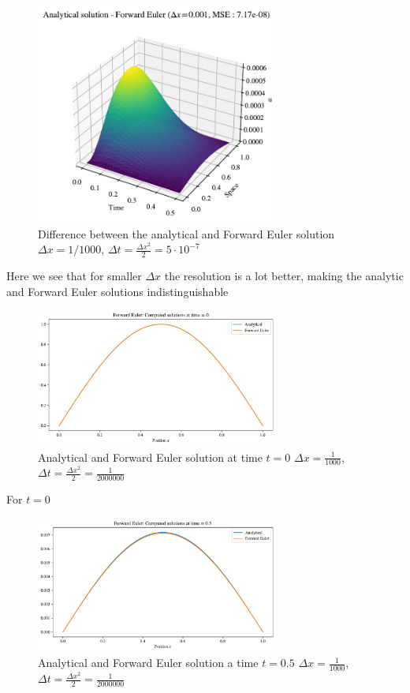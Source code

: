 \documentclass{article}
\theoremstyle{definition}
\begin{document}
\begin{figure}[H]%
    \centering
    \includegraphics[width=8cm]{Project3/figures/1dHeat/dx=0.001.pdf}
    \caption{Difference between the analytical and Forward Euler solution $\Delta x = 1 / 1000$, $\Delta t = \frac{\Delta x^2}{2} = 5 \cdot 10^{-7}$}
    \label{fig:ForwardEulerdx=0.001}
\end{figure}



Here we see that for smaller $\Delta x$ the resolution is a lot better, making the analytic and Forward Euler solutions indistinguishable 


\begin{figure}[H]%
    \centering
    \includegraphics[width=8cm]{Project3/figures/1dHeat/difference_surf_dx_0.001_timestep_0.0.pdf}
    \caption{Analytical and Forward Euler solution  at time $t=0$ $\Delta x = \frac{1}{1000}$, $\Delta t = \frac{\Delta x^2}{2} = \frac{1}{2000000} $}
    \label{fig:ForwardEulerdx=0.001t=0}
\end{figure}

For $t = 0$

\begin{figure}[H]%
    \centering
    \includegraphics[width=8cm]{Project3/figures/1dHeat/difference_surf_dx_0.001_timestep_0.5000004768371582.pdf}
    \caption{Analytical and Forward Euler solution a time $t = 0.5$ $\Delta x = \frac{1}{1000}$, $\Delta t = \frac{\Delta x^2}{2} = \frac{1}{2000000} $}
    \label{fig:ForwardEulerdx=0.001t=0.5}
\end{figure}
\end{document}
